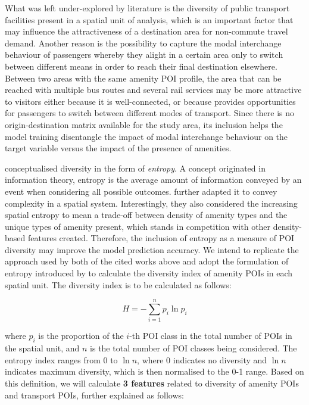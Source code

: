 What was left under-explored by literature is the diversity of public transport facilities present in a spatial unit of analysis, which is an important factor that may influence the attractiveness of a destination area for non-commute travel demand. Another reason is the possibility to capture the modal interchange behaviour of passengers whereby they alight in a certain area only to switch between different means in order to reach their final destination elsewhere. Between two areas with the same amenity POI profile, the area that can be reached with multiple bus routes and several rail services may be more attractive to visitors either because it is well-connected, or because provides opportunities for passengers to switch between different modes of transport. Since there is no origin-destination matrix available for the study area, its inclusion helps the model training disentangle the impact of modal interchange behaviour on the target variable versus the impact of the presence of amenities. 

\citet{cerveroTravelDemand3Ds1997} conceptualised diversity in the form of \textit{entropy}. A concept originated in information theory, entropy is the average amount of information conveyed by an event when considering all possible outcomes. \citet{battyEntropyComplexitySpatial2014} further adapted it to convey complexity in a spatial system. Interestingly, they also considered the increasing spatial entropy to mean a trade-off between density of amenity types and the unique types of amenity present, which stands in competition with other density-based features created. Therefore, the inclusion of entropy as a measure of POI diversity may improve the model prediction accuracy. We intend to replicate the approach used by both of the cited works above and adopt the formulation of entropy introduced by \citet{shannonMathematicalTheoryCommunication1948} to calculate the diversity index of amenity POIs in each spatial unit. The diversity index is to be calculated as follows:

\begin{equation}
    H = -\sum_{i=1}^{n} p_i \ln p_i
\end{equation}

where $p_i$ is the proportion of the $i$-th POI class in the total number of POIs in the spatial unit, and $n$ is the total number of POI classes being considered. The entropy index ranges from 0 to $\ln n$, where 0 indicates no diversity and $\ln n$ indicates maximum diversity, which is then normalised to the 0-1 range. Based on this definition, we will calculate \textbf{3 features} related to diversity of amenity POIs and transport POIs, further explained as follows:

